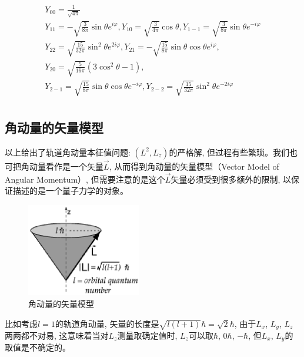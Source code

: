 \begin{equation}
\begin{array}{l}
 Y_{00}  = \frac{1}{{\sqrt {4\pi } }} \\
 Y_{11}  =  - \sqrt {\frac{3}{{8\pi }}} \sin \theta e^{i\varphi } ,Y_{10}  = \sqrt {\frac{3}{{4\pi }}} \cos \theta ,Y_{1 - 1}  = \sqrt {\frac{3}{{8\pi }}} \sin \theta e^{ - i\varphi }  \\
 Y_{22}  = \sqrt {\frac{{15}}{{32\pi }}} \sin ^2 \theta e^{2i\varphi } ,Y_{21}  =  - \sqrt {\frac{{15}}{{8\pi }}} \sin \theta \cos \theta e^{i\varphi } , \\
 Y_{20}  = \sqrt {\frac{5}{{16\pi }}} \left( {3\cos ^2 \theta  - 1} \right), \\
 Y_{2 - 1}  = \sqrt {\frac{{15}}{{8\pi }}} \sin \theta \cos \theta e^{ - i\varphi } ,Y_{2 - 2}  = \sqrt {\frac{{15}}{{32\pi }}} \sin ^2 \theta e^{ - 2i\varphi }  \\
 \end{array}
\end{equation}


\subsection{角动量的矢量模型}


以上给出了轨道角动量本征值问题: $(L^2, L_z)$的严格解,
但过程有些繁琐。我们也可把角动量看作是一个矢量$\vec L$,
从而得到角动量的矢量模型（Vector Model of Angular Momentum）,
但需要注意的是这个$\vec L$矢量必须受到很多额外的限制,
以保证描述的是一个量子力学的对象。

\begin{figure}[h]
\begin{center}
\includegraphics[clip,width=5cm]{AngularMomentum/vec-angular-momentum.ps}
\caption{角动量的矢量模型}
\end{center}
\end{figure}

比如考虑$l=1$的轨道角动量, 矢量的长度是$\sqrt{l (l+1)} \hbar = \sqrt
2 \hbar$, 由于$L_x$, $L_y$, $L_z$两两都不对易,
这意味着当对$L_z$测量取确定值时, $L_z$可以取$\hbar$, $0 \hbar$, $-
\hbar$, 但$L_x$, $L_y$的取值是不确定的。


